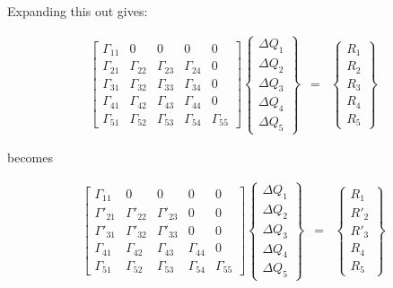 Expanding this out gives:

\begin{eqnarray}
\left[
\begin{array}{ccccc}
\Gamma_{11} & 0 & 0 & 0 & 0 \\
\Gamma_{21} & \Gamma_{22} & \Gamma_{23} & \Gamma_{24} & 0  \\
\Gamma_{31} & \Gamma_{32} & \Gamma_{33} & \Gamma_{34} & 0  \\
\Gamma_{41} & \Gamma_{42} & \Gamma_{43} & \Gamma_{44} & 0  \\
\Gamma_{51} & \Gamma_{52} & \Gamma_{53} & \Gamma_{54} & \Gamma_{55} 
\end{array}
\right]
\left\{
\begin{array}{c}
\Delta Q_1 \\
\Delta Q_2 \\
\Delta Q_3 \\
\Delta Q_4 \\
\Delta Q_5 
\end{array}
\right\}
&=&
\left\{
\begin{array}{c}
R_1 \\
R_2 \\
R_3 \\
R_4 \\
R_5 
\end{array}
\right\}
\nonumber
\end{eqnarray}

becomes

\begin{eqnarray}
\left[
\begin{array}{ccccc}
\Gamma_{11} & 0 & 0 & 0 & 0 \\
\Gamma'_{21} & \Gamma'_{22} & \Gamma'_{23} & 0 & 0  \\
\Gamma'_{31} & \Gamma'_{32} & \Gamma'_{33} & 0 & 0  \\
\Gamma_{41} & \Gamma_{42} & \Gamma_{43} & \Gamma_{44} & 0  \\
\Gamma_{51} & \Gamma_{52} & \Gamma_{53} & \Gamma_{54} & \Gamma_{55} 
\end{array}
\right]
\left\{
\begin{array}{c}
\Delta Q_1 \\
\Delta Q_2 \\
\Delta Q_3 \\
\Delta Q_4 \\
\Delta Q_5 
\end{array}
\right\}
&=&
\left\{
\begin{array}{c}
R_1 \\
R'_2 \\
R'_3 \\
R_4 \\
R_5 
\end{array}
\right\}
\nonumber
\end{eqnarray}


